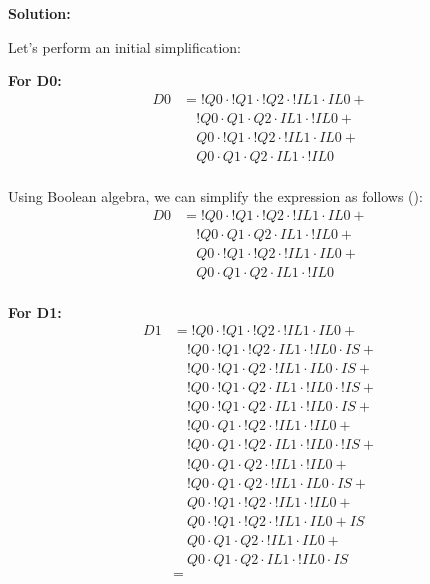 \textbf{Solution:}

\noindent
Let's perform an initial simplification:

\textbf{For D0:}
\begin{align*}
    D0 &= !Q0 \cdot !Q1 \cdot !Q2 \cdot !IL1 \cdot IL0 + \\
       &\quad !Q0 \cdot Q1 \cdot Q2 \cdot IL1 \cdot !IL0 + \\
       &\quad Q0 \cdot !Q1 \cdot !Q2 \cdot !IL1 \cdot IL0 + \\
       &\quad Q0 \cdot Q1 \cdot Q2 \cdot IL1 \cdot !IL0 \\
\end{align*}

\noindent
Using Boolean algebra, we can simplify the expression as follows (\cite{boolean-algebra}):
\begin{align*}
    D0 &= !Q0 \cdot !Q1 \cdot !Q2 \cdot !IL1 \cdot IL0 + \\
       &\quad !Q0 \cdot Q1 \cdot Q2 \cdot IL1 \cdot !IL0 + \\
       &\quad Q0 \cdot !Q1 \cdot !Q2 \cdot !IL1 \cdot IL0 + \\
       &\quad Q0 \cdot Q1 \cdot Q2 \cdot IL1 \cdot !IL0 \\
\end{align*}


\textbf{For D1:}
\begin{align*}
    D1 &= !Q0 \cdot !Q1 \cdot !Q2 \cdot !IL1 \cdot IL0 + \\
       &\quad !Q0 \cdot !Q1 \cdot !Q2 \cdot IL1 \cdot !IL0 \cdot IS + \\
       &\quad !Q0 \cdot !Q1 \cdot Q2 \cdot !IL1 \cdot IL0 \cdot IS + \\
       &\quad !Q0 \cdot !Q1 \cdot Q2 \cdot IL1 \cdot !IL0 \cdot !IS + \\
       &\quad !Q0 \cdot !Q1 \cdot Q2 \cdot IL1 \cdot !IL0 \cdot IS + \\
       &\quad !Q0 \cdot Q1 \cdot !Q2 \cdot !IL1 \cdot !IL0 + \\
       &\quad !Q0 \cdot Q1 \cdot !Q2 \cdot IL1 \cdot !IL0 \cdot !IS + \\
       &\quad !Q0 \cdot Q1 \cdot Q2 \cdot !IL1 \cdot !IL0+ \\
       &\quad !Q0 \cdot Q1 \cdot Q2 \cdot !IL1 \cdot IL0 \cdot IS + \\
       &\quad Q0 \cdot !Q1 \cdot !Q2 \cdot !IL1 \cdot !IL0 + \\
       &\quad Q0 \cdot !Q1 \cdot !Q2 \cdot !IL1 \cdot IL0 + IS \\
       &\quad Q0 \cdot Q1 \cdot Q2 \cdot !IL1 \cdot IL0 + \\
       &\quad Q0 \cdot Q1 \cdot Q2 \cdot IL1 \cdot !IL0 \cdot IS \\
    &= 
\end{align*}


